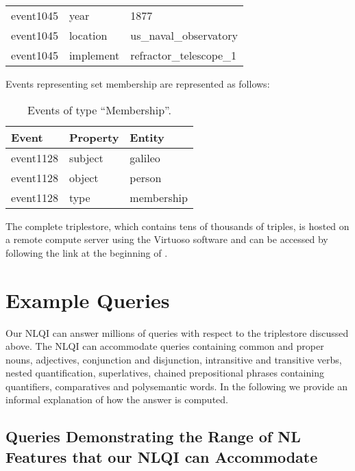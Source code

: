 \documentclass[../main.tex]{subfiles}
\begin{document}
\begin{refsection}
\begin{table}[h]
\begin{tabular}{lll}
		event1045 &
		year &
		1877 \\

		event1045 &
		location &
		us\_naval\_observatory \\

		event1045 &
		implement &
		refractor\_telescope\_1 \\
		\bottomrule
	\end{tabular}
\end{table}

Events representing set membership are represented as follows:

\begin{table}[h]
	\caption{Events of type ``Membership''.}
	\label{webist2019conf:evmember}
	\centering
	\begin{tabular}{lll}
		\toprule
		Event & Property & Entity \\
		\midrule
		event1128 &
		subject &
		galileo \\

		event1128 &
		object &
		person \\

		event1128 &
		type &
		membership \\
		\bottomrule
	\end{tabular}
\end{table}

The complete triplestore, which contains tens of thousands of triples,  is hosted on a remote compute server using the Virtuoso software \cite{virtuoso} and can be accessed by following the link at the beginning of .

\section{Example Queries}
\label{webist2019conf:examples}

Our NLQI can answer millions of queries with respect to the triplestore discussed above. The NLQI can accommodate queries containing common and proper nouns, adjectives, conjunction and disjunction, intransitive and transitive verbs, nested quantification, superlatives, chained prepositional phrases containing quantifiers, comparatives and polysemantic words. In the following we provide an informal explanation of how the answer is computed.

\subsection{Queries Demonstrating the Range of NL Features that our NLQI can Accommodate}
\label{webist2019conf:nlexamples}


\end{refsection}
\end{document}

